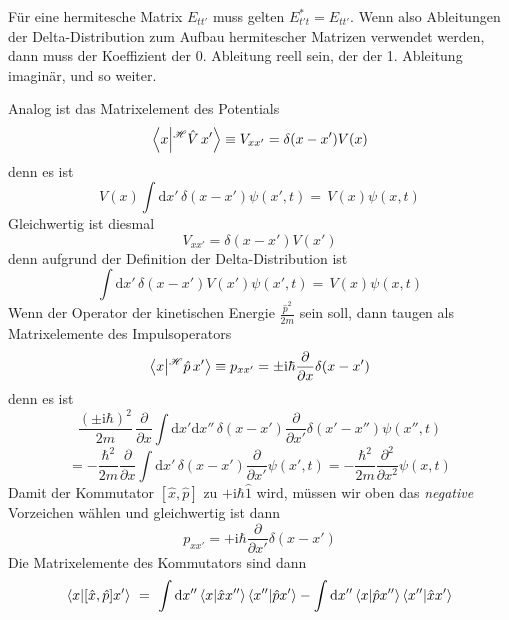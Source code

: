 \documentclass[12pt]{article}
\begin{document}
Für eine hermitesche Matrix $E_{tt'}$ muss gelten $E_{t't}^* = E_{tt'}$. Wenn also Ableitungen der Delta-Distribution zum Aufbau hermitescher Matrizen verwendet werden, dann muss der Koeffizient der 0. Ableitung reell sein, der der 1. Ableitung imaginär, und so weiter.

Analog ist das Matrixelement des Potentials
\begin{equation*}
\bra{x}\ket{^\mathscr{H}\hat{V}\,x'}\equiv V_{xx'} = 
\delta(x-x') V(x)
\end{equation*}
denn es ist
\begin{equation*}
V(x) \int \mathrm{d}x'\,\delta(x-x') \psi (x',t)
=\, V(x) \psi (x,t)
\end{equation*}
Gleichwertig ist diesmal 
\begin{equation*}
V_{xx'} = \delta(x-x') V(x')
\end{equation*}
denn aufgrund der Definition der Delta-Distribution ist
\begin{equation*}
\int \mathrm{d}x'\,\delta(x-x') V(x') \psi (x',t)
=\, V(x) \psi (x,t)
\end{equation*}
Wenn der Operator der kinetischen Energie $\frac{\hat{p}^2}{2m}$ sein soll, dann taugen als Matrixelemente des Impulsoperators
\begin{equation*}
\bra{x}\ket{^\mathscr{H}\hat{p}\,x'}\equiv p_{xx'} = 
\pm \mathrm {i} \hbar \frac{\partial }{\partial x}\delta(x-x')
\end{equation*} 
denn es ist
\begin{equation*}
\frac{(\pm\mathrm{i}\hbar)^2}{2m}\,\frac{\partial }{\partial x} 
\int \mathrm{d}x'\mathrm{d}x''\,\delta(x-x') \frac{\partial }{\partial x'} \delta(x'-x'')\psi(x'',t)
\end{equation*}
\begin{equation*}
=-\frac{\hbar^2}{2m} \frac{\partial }{\partial x}\int \mathrm{d}x'\,\delta(x-x')\frac{\partial }{\partial x'} \psi(x',t)
=-\frac{\hbar^2}{2m} \frac {\partial^2}{\partial x^2}\psi (x,t)
\end{equation*}
Damit der Kommutator $[\hat{x},\hat{p}]$ zu $+\mathrm{i}\hbar\hat{1}$ wird, müssen wir oben das \emph{negative} Vorzeichen wählen und gleichwertig ist dann
\begin{equation*}
p_{xx'} = + \mathrm {i} \hbar \frac{\partial }{\partial x'}\delta(x-x')
\end{equation*} 
Die Matrixelemente des Kommutators sind dann
\begin{equation*}
\bra{x}\ket{[\hat{x},\hat{p}]x'}\ =\ 
\int \mathrm{d}x'' \bra{x}\ket{\hat{x}x''} \bra{x''}\ket{\hat{p}x'} 
- \int \mathrm{d}x'' \bra{x}\ket{\hat{p}x''} \bra{x''}\ket{\hat{x}x'} 
\end{equation*}
\end{document}
